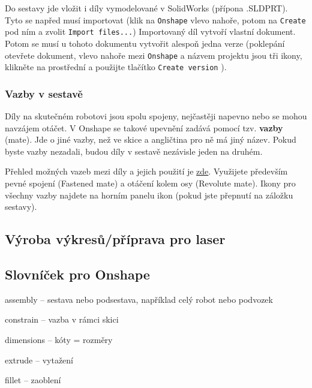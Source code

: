 Do sestavy jde vložit i díly vymodelované v SolidWorks (přípona .SLDPRT). 
Tyto se napřed musí importovat (klik na {\tt Onshape} vlevo nahoře, potom na {\tt Create } pod ním a zvolit {\tt Import files...}) 
Importovaný díl vytvoří vlastní dokument. Potom se musí u tohoto dokumentu vytvořit alespoň jedna verze (poklepání otevřete dokument, vlevo nahoře mezi {\tt Onshape} 
a názvem projektu jsou tři ikony, klikněte na prostřední a použijte tlačítko {\tt Create version} ). 

\subsubsection{Vazby v sestavě}


Díly na skutečném robotovi jsou spolu spojeny, nejčastěji napevno nebo se mohou navzájem otáčet.  
V Onshape se takové upevnění zadává pomocí tzv. \textbf{vazby} (mate).
Jde o jiné vazby, než ve skice a angličtina pro ně má jiný název.  
Pokud byste vazby nezadali, budou díly v sestavě  nezávisle jeden na druhém. 

Přehled možných vazeb mezi díly a jejich použití je \href{https://cad.onshape.com/help/Content/mate.htm?TocPath=Desktop%20Help|Assemblies|Mates|_____0}{zde}.
Využijete především pevné spojení (Fastened mate) a otáčení kolem osy (Revolute mate). 
Ikony pro všechny vazby najdete na horním panelu ikon (pokud jste přepnutí na záložku sestavy).


\subsection{Výroba výkresů/příprava pro laser} \label{laser:vykresy}






\subsection{Slovníček pro Onshape}

assembly -- sestava nebo podsestava, například celý robot nebo podvozek

constrain -- vazba v rámci skici

dimensions -- kóty = rozměry 

extrude -- vytažení 

fillet -- zaoblení 

